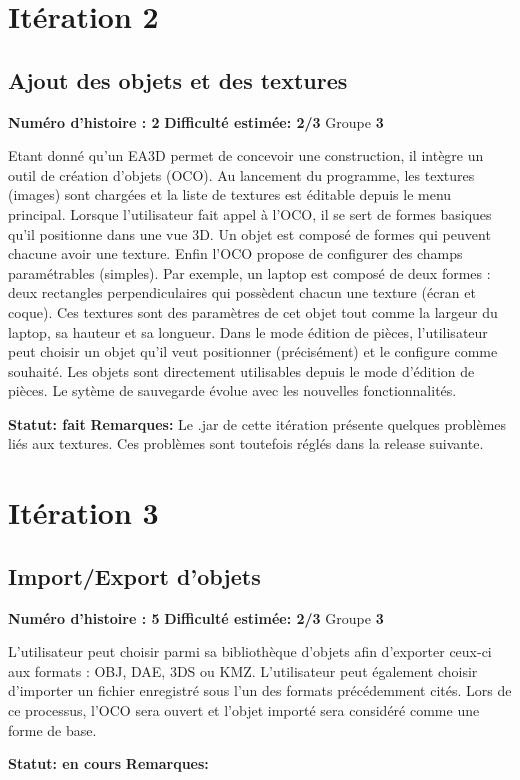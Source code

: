\documentclass[a4paper]{article} \usepackage{framed} \usepackage{fullpage} \usepackage[french]{babel} \usepackage[utf8]{inputenc} \usepackage[T1]{fontenc}
\begin{document}
\section{Itération 2}
\begin{framed}
\subsection{Ajout des objets et des textures}

\textbf{Numéro d'histoire : 2}  
\textbf{Difficulté estimée: 2/3}  Groupe \textbf{3}

Etant donné qu'un EA3D permet de concevoir une construction, il intègre un outil de création d'objets (OCO). Au lancement du programme, les textures (images) sont chargées et la liste de textures est éditable depuis le menu principal.
Lorsque l'utilisateur fait appel à l'OCO, il se sert de formes basiques qu'il positionne dans une vue 3D. Un objet est composé de formes qui peuvent chacune avoir une texture. Enfin l'OCO propose de configurer des champs paramétrables (simples). Par exemple, un laptop est composé de deux formes : deux rectangles perpendiculaires qui possèdent chacun une texture (écran et coque). Ces textures sont des paramètres de cet objet tout comme la largeur du laptop, sa hauteur et sa longueur.
Dans le mode édition de pièces, l'utilisateur peut choisir un objet qu'il veut positionner (précisément) et le configure comme souhaité. Les objets sont directement utilisables depuis le mode d'édition de pièces. Le sytème de sauvegarde évolue avec les nouvelles fonctionnalités.

\textbf{Statut: fait}  \textbf{Remarques:} Le .jar de cette itération 
présente quelques problèmes liés aux textures. Ces problèmes sont toutefois réglés dans la release suivante.
\end{framed}

\section{Itération 3}
\begin{framed}
\subsection{Import/Export d'objets}

\textbf{Numéro d'histoire : 5}  
\textbf{Difficulté estimée: 2/3}  Groupe \textbf{3}

L'utilisateur peut choisir parmi sa bibliothèque d'objets afin d'exporter ceux-ci aux formats : OBJ, DAE, 3DS ou KMZ.
L'utilisateur peut également choisir d'importer un fichier enregistré sous l'un des formats précédemment cités. Lors de ce processus, l'OCO sera ouvert et l'objet importé sera considéré comme une forme de base.

\textbf{Statut: en cours}  \textbf{Remarques:}
\end{framed}
\end{document}
